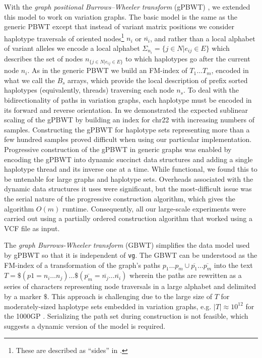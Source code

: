 With the \emph{graph positional Burrows–Wheeler transform} (gPBWT) \cite{Novak2016gPBWT}, we extended this model to work on variation graphs.
The basic model is the same as the generic PBWT except that instead of variant matrix positions we consider haplotype traversals of oriented nodes\footnote{These are described as ``sides'' in \cite{Novak2016gPBWT}.} $n_i$ or $\overline{n_i}$, and rather than a local alphabet of variant alleles we encode a local alphabet $\Sigma_{n_i} = \{ j \in N | e_{ij} \in E \}$ which describes the set of nodes $n_{\{j \in N | e_{ij} \in E \}}$ to which haplotypes go after the current node $n_i$.
As in the generic PBWT we build an FM-index of $T_1 \ldots T_m$, encoded in what we call the $B_s$ arrays, which provide the local description of prefix sorted haplotypes (equivalently, threads) traversing each node $n_s$.
To deal with the bidirectionality of paths in variation graphs, each haplotype must be encoded in its forward and reverse orientation.
In \cite{Novak2016gPBWT} we demonstrated the expected sublinear scaling of the gPBWT by building an index for chr22 with increasing numbers of samples.
Constructing the gPBWT for haplotype sets representing more than a few hundred samples proved difficult when using our particular implementation.
Progressive construction of the gPBWT in generic graphs was enabled by encoding the gPBWT into dynamic succinct data structures and adding a single haplotype thread and its inverse one at a time.
While functional, we found this to be untenable for large graphs and haplotype sets.
Overheads associated with the dynamic data structures it uses were significant, but the most-difficult issue was the serial nature of the progressive construction algorithm, which gives the algorithm $O(m)$ runtime.
Consequently, all our large-scale experiments were carried out using a partially ordered construction algorithm that worked using a VCF file as input.

The \emph{graph Burrows-Wheeler transform} (GBWT) \cite{siren2018haplotype} simplifies the data model used by gPBWT so that it is independent of {\tt vg}.
The GBWT can be understood as the FM-index of a transformation of the graph's paths $p_1\ldots p_m \cup \overline{p_1}\ldots \overline{p_m}$ into the text $T = \$( p1 = n_i\ldots n_j) \ldots \$ (\overline{p_m} = \overline{n_j} \ldots \overline{n_i}) $ wherein the paths are rewritten as a series of characters representing node traversals in a large alphabet and delimited by a marker $\$$.
This approach is challenging due to the large size of $T$ for moderately-sized haplotype sets embedded in variation graphs, e.g. $|T| \approx 10^{12}$ for the 1000GP \cite{siren2018haplotype}.
Serializing the path set during construction is not feasible, which suggests a dynamic version of the model is required.

